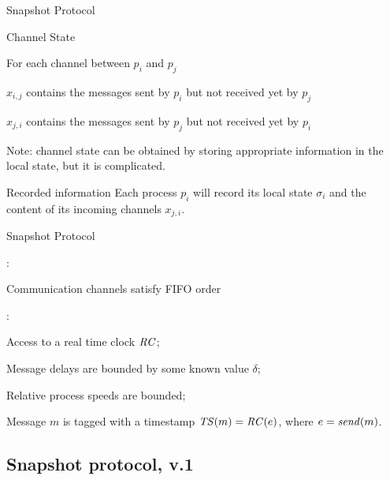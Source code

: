 \begin{frame}{Snapshot Protocol}

\begin{block}{Channel State}
\BIL
\item For each channel between $p_i$ and $p_j$
  \BI
    \item $x_{i,j}$ contains the messages sent by $p_i$ but not received yet by $p_j$ 
    \item $x_{j,i}$ contains the messages sent by $p_j$ but not received yet by $p_i$ 
  \EI
\item Note: channel state can be obtained by storing appropriate information
  in the local state, but it is complicated.
\EIL
\end{block}

\bigskip
\begin{block}{Recorded information}
Each process $p_i$ will record its local state $\sigma_i$ and the content of its
\alert{incoming} channels $x_{j,i}$.
\end{block}

\end{frame}

\begin{frame}{Snapshot Protocol}

:
\BIL
\item Communication channels satisfy FIFO order
\EIL

\bigskip
{}:
\BIL
\item Access to a real time clock $\mathit{RC}$;
\item Message delays are bounded by some known value $\delta$;
\item Relative process speeds are bounded;
\item Message $m$ is tagged with a timestamp $\mathit{TS}(m) = \mathit{RC}(e)$, where $e = \mathit{send}(m)$.
\EIL
\end{frame}

\subsection{Snapshot protocol, v.1}

